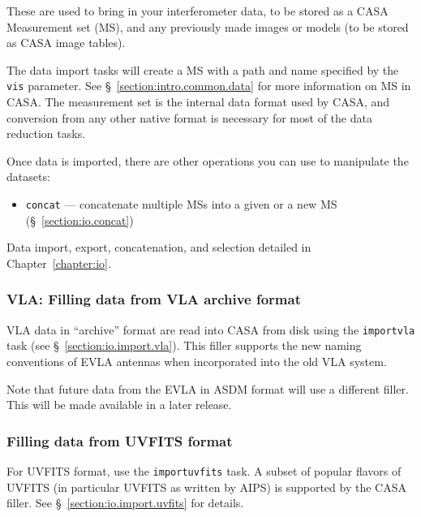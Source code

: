 These are used to bring in your interferometer data, to be stored
as a CASA Measurement set (MS), and any previously made images
or models (to be stored as CASA image tables).  

The data import tasks will create a MS with a path and name specified
by the {\tt vis} parameter.  See \S~\ref{section:intro.common.data}
for more information on MS in CASA.  The measurement set is the 
internal data format used by CASA, and conversion from any other
native format is necessary for most of the data reduction tasks.

Once data is imported, there are other operations you can use to
manipulate the datasets:
\begin{itemize}
   \item {\tt concat} --- concatenate multiple MSs into a
         given or a new MS (\S~\ref{section:io.concat})
\end{itemize}

Data import, export, concatenation, and selection
detailed in Chapter~\ref{chapter:io}.

\subsubsection{VLA: Filling data from VLA archive format}
\label{section:intro.walkthru.load.VLAfill}

VLA data in ``archive'' format are read into CASA from disk using
the {\tt importvla} task (see \S~\ref{section:io.import.vla}).  
This filler supports the new naming conventions of EVLA antennas
when incorporated into the old VLA system.


Note that future data from the EVLA in ASDM format will use a
different filler.  This will be made available in a later release.

\subsubsection{Filling data from UVFITS format}
\label{section:intro.walkthru.load.uvfits}

For UVFITS format, use the {\tt importuvfits} task. A subset of popular
flavors of UVFITS (in particular UVFITS as written by AIPS) is
supported by the CASA filler.  See \S~\ref{section:io.import.uvfits}
for details.


